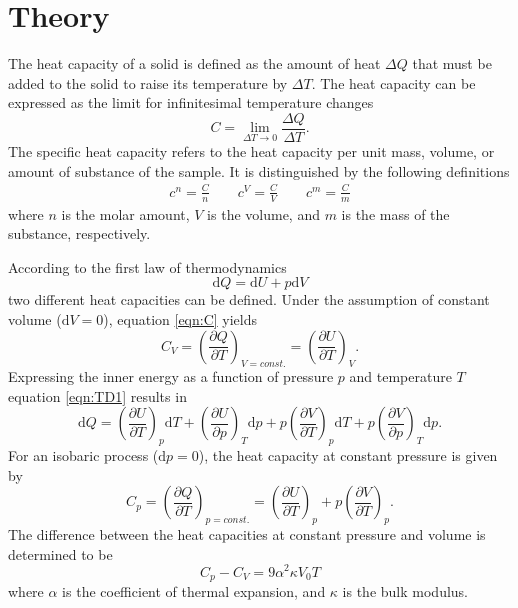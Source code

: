 \section{Theory}
\label{sec:theory}

The heat capacity of a solid is defined as the amount of 
heat $\Delta Q$ that must be added to the solid to raise 
its temperature by $\Delta T$. 
The heat capacity can be expressed as the limit for infinitesimal 
temperature changes
\begin{equation}
    C=\lim_{\Delta T\to 0}\frac{\Delta Q}{\Delta T}.
    \label{eqn:C}
\end{equation}
The specific heat capacity refers to the heat capacity per unit 
mass, volume, or amount of substance of the sample. It is 
distinguished by the following definitions
\begin{align*}
    c^n=\frac{C}{n} \qquad
    c^V=\frac{C}{V} \qquad
    c^m=\frac{C}{m}
\end{align*}
where $n$ is the molar amount, $V$ is the volume, and $m$ is 
the mass of the substance, respectively. 

According to the first law of thermodynamics
\begin{equation}
    \text{d}Q=\text{d}U+p\text{d}V
    \label{eqn:TD1}
\end{equation}
two different heat capacities can be defined. 
Under the assumption of constant volume ($\text{d}V=0$), 
equation \eqref{eqn:C} yields 
\begin{equation}
    C_V=\left(\frac{\partial Q}{\partial T}\right)_{V=const.}=\left(\frac{\partial U}{\partial T}\right)_V.
    \label{eqn:CV}
\end{equation}
Expressing the inner energy as a function of pressure $p$ and temperature $T$
equation \eqref{eqn:TD1} results in
\begin{equation*}
    \text{d}Q 
    =\left(\frac{\partial U}{\partial T}\right)_p \text{d} T 
    +\left(\frac{\partial U}{\partial p}\right)_T \text{d} p
    +p\left(\frac{\partial V}{\partial T}\right)_p \text{d} T
    +p\left(\frac{\partial V}{\partial p}\right)_T \text{d} p.
\end{equation*}
For an isobaric process ($\text{d}p=0$), the heat capacity at 
constant pressure is given by
\begin{equation}
    C_p=\left(\frac{\partial Q}{\partial T}\right)_{p=const.}
    =\left(\frac{\partial U}{\partial T}\right)_p
    +p\left(\frac{\partial V}{\partial T}\right)_p.
    \label{eqn:Cp}
\end{equation}
The difference between the heat capacities at constant pressure and volume is
determined to be
\begin{equation}
    C_p-C_V=9\alpha^2\kappa V_0T
    \label{eqn:cv}
\end{equation}
where $\alpha$ is the coefficient of thermal expansion, and $\kappa$ is the bulk modulus. 

